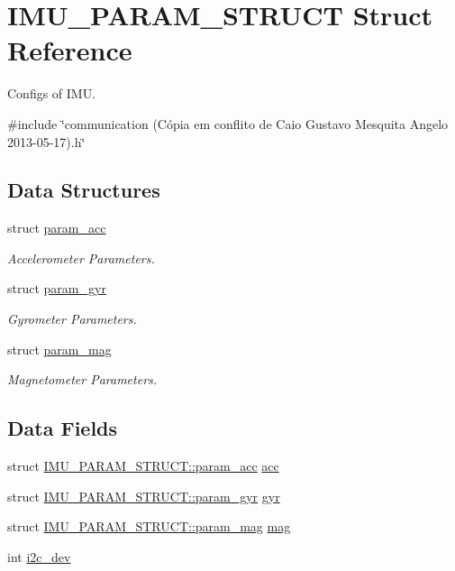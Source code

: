 \hypertarget{structIMU__PARAM__STRUCT}{\section{I\-M\-U\-\_\-\-P\-A\-R\-A\-M\-\_\-\-S\-T\-R\-U\-C\-T Struct Reference}
\label{structIMU__PARAM__STRUCT}
}


Configs of I\-M\-U.  




{\ttfamily \#include \char`\"{}communication (\-Cópia em conflito de Caio Gustavo Mesquita Angelo 2013-\/05-\/17).\-h\char`\"{}}

\subsection*{Data Structures}
\begin{DoxyCompactItemize}
\item 
struct \hyperlink{structIMU__PARAM__STRUCT_1_1param__acc}{param\-\_\-acc}
\begin{DoxyCompactList}\small\item\em Accelerometer Parameters. \end{DoxyCompactList}\item 
struct \hyperlink{structIMU__PARAM__STRUCT_1_1param__gyr}{param\-\_\-gyr}
\begin{DoxyCompactList}\small\item\em Gyrometer Parameters. \end{DoxyCompactList}\item 
struct \hyperlink{structIMU__PARAM__STRUCT_1_1param__mag}{param\-\_\-mag}
\begin{DoxyCompactList}\small\item\em Magnetometer Parameters. \end{DoxyCompactList}\end{DoxyCompactItemize}
\subsection*{Data Fields}
\begin{DoxyCompactItemize}
\item 
struct \hyperlink{structIMU__PARAM__STRUCT_1_1param__acc}{I\-M\-U\-\_\-\-P\-A\-R\-A\-M\-\_\-\-S\-T\-R\-U\-C\-T\-::param\-\_\-acc} \hyperlink{structIMU__PARAM__STRUCT_a92172e4757d0f8f9135a659e406c12e5}{acc}
\item 
struct \hyperlink{structIMU__PARAM__STRUCT_1_1param__gyr}{I\-M\-U\-\_\-\-P\-A\-R\-A\-M\-\_\-\-S\-T\-R\-U\-C\-T\-::param\-\_\-gyr} \hyperlink{structIMU__PARAM__STRUCT_a5a4557868f1af679a1098808397b02ec}{gyr}
\item 
struct \hyperlink{structIMU__PARAM__STRUCT_1_1param__mag}{I\-M\-U\-\_\-\-P\-A\-R\-A\-M\-\_\-\-S\-T\-R\-U\-C\-T\-::param\-\_\-mag} \hyperlink{structIMU__PARAM__STRUCT_a26b277dcaf05f3842995df888225f6f4}{mag}
\item 
int \hyperlink{structIMU__PARAM__STRUCT_a8a870f383fc9ba0b682fdc9b8c0d2734}{i2c\-\_\-dev}
\end{DoxyCompactItemize}


